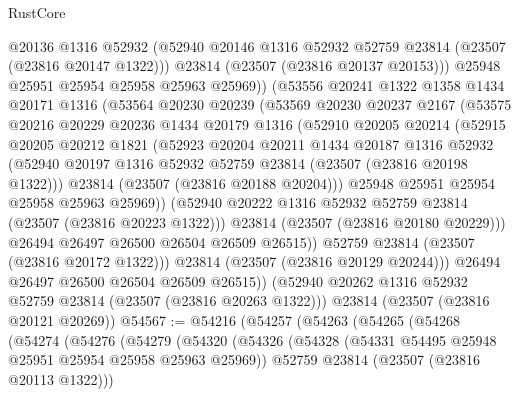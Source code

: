 \begin{lexlean}{RustCore}
\begin{coremodule}
                @20136
                @1316
                @52932
                (@52940 @20146 @1316 @52932 @52759 @23814 (@23507 (@23816 @20147 @1322)))
                @23814
                (@23507 (@23816 @20137 @20153)))
              @25948
              @25951
              @25954
              @25958
              @25963
              @25969))
          (@53556
            @20241
            @1322
            @1358
            @1434
            @20171
            @1316
            (@53564
              @20230
              @20239
              (@53569
                @20230
                @20237
                @2167
                (@53575
                  @20216
                  @20229
                  @20236
                  @1434
                  @20179
                  @1316
                  (@52910
                    @20205
                    @20214
                    (@52915
                      @20205
                      @20212
                      @1821
                      (@52923
                        @20204
                        @20211
                        @1434
                        @20187
                        @1316
                        @52932
                        (@52940 @20197 @1316 @52932 @52759 @23814 (@23507 (@23816 @20198 @1322)))
                        @23814
                        (@23507 (@23816 @20188 @20204)))
                      @25948
                      @25951
                      @25954
                      @25958
                      @25963
                      @25969))
                  (@52940 @20222 @1316 @52932 @52759 @23814 (@23507 (@23816 @20223 @1322)))
                  @23814
                  (@23507 (@23816 @20180 @20229)))
                @26494
                @26497
                @26500
                @26504
                @26509
                @26515))
            @52759
            @23814
            (@23507 (@23816 @20172 @1322)))
          @23814
          (@23507 (@23816 @20129 @20244)))
        @26494
        @26497
        @26500
        @26504
        @26509
        @26515))
    (@52940 @20262 @1316 @52932 @52759 @23814 (@23507 (@23816 @20263 @1322)))
    @23814
    (@23507 (@23816 @20121 @20269))
@54567 := @54216
    (@54257
      (@54263
        (@54265
          (@54268
            (@54274
              (@54276
                (@54279
                  (@54320
                    (@54326
                      (@54328 (@54331 @54495 @25948 @25951 @25954 @25958 @25963 @25969))
                      @52759
                      @23814
                      (@23507 (@23816 @20113 @1322)))

\end{coremodule}
\end{lexlean}
